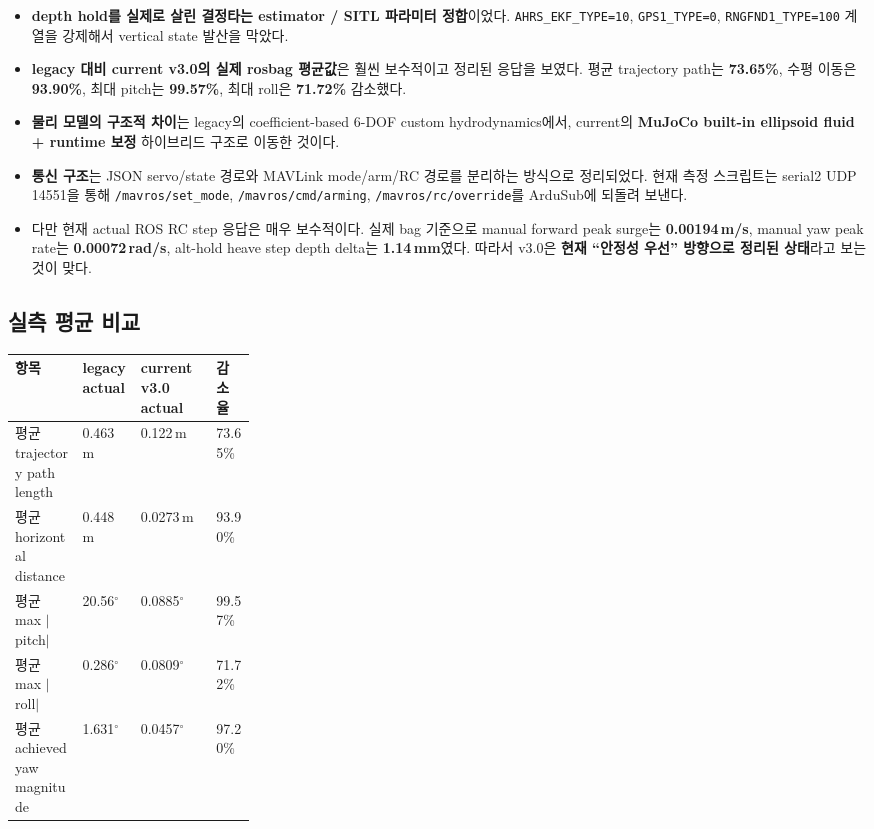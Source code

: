 \documentclass[11pt,a4paper]{article}
\newcommand{\code}[1]{\nolinkurl{#1}}
\begin{document}
\begin{itemize}[leftmargin=2em]
  \item \textbf{depth hold를 실제로 살린 결정타는 estimator / SITL 파라미터 정합}이었다. \code{AHRS\_EKF\_TYPE=10}, \code{GPS1\_TYPE=0}, \code{RNGFND1\_TYPE=100} 계열을 강제해서 vertical state 발산을 막았다.
  \item \textbf{legacy 대비 current v3.0의 실제 rosbag 평균값}은 훨씬 보수적이고 정리된 응답을 보였다. 평균 trajectory path는 \textbf{73.65\%}, 수평 이동은 \textbf{93.90\%}, 최대 pitch는 \textbf{99.57\%}, 최대 roll은 \textbf{71.72\%} 감소했다.
  \item \textbf{물리 모델의 구조적 차이}는 legacy의 coefficient-based 6-DOF custom hydrodynamics에서, current의 \textbf{MuJoCo built-in ellipsoid fluid + runtime 보정} 하이브리드 구조로 이동한 것이다.
  \item \textbf{통신 구조}는 JSON servo/state 경로와 MAVLink mode/arm/RC 경로를 분리하는 방식으로 정리되었다. 현재 측정 스크립트는 serial2 UDP 14551을 통해 \code{/mavros/set\_mode}, \code{/mavros/cmd/arming}, \code{/mavros/rc/override}를 ArduSub에 되돌려 보낸다.
  \item 다만 현재 actual ROS RC step 응답은 매우 보수적이다. 실제 bag 기준으로 manual forward peak surge는 \textbf{0.00194\,m/s}, manual yaw peak rate는 \textbf{0.00072\,rad/s}, alt-hold heave step depth delta는 \textbf{1.14\,mm}였다. 따라서 v3.0은 \textbf{현재 ``안정성 우선'' 방향으로 정리된 상태}라고 보는 것이 맞다.
\end{itemize}

\subsection{실측 평균 비교}

\begin{center}
\small
\begin{tabularx}{\linewidth}{>{\raggedright\arraybackslash}p{0.28\linewidth}YYY}
\toprule
항목 & legacy actual & current v3.0 actual & 감소율 \\
\midrule
평균 trajectory path length & 0.463\,m & 0.122\,m & 73.65\% \\
평균 horizontal distance & 0.448\,m & 0.0273\,m & 93.90\% \\
평균 max $|$pitch$|$ & 20.56$^\circ$ & 0.0885$^\circ$ & 99.57\% \\
평균 max $|$roll$|$ & 0.286$^\circ$ & 0.0809$^\circ$ & 71.72\% \\
평균 achieved yaw magnitude & 1.631$^\circ$ & 0.0457$^\circ$ & 97.20\% \\
\bottomrule
\end{tabularx}
\end{center}
\end{document}
